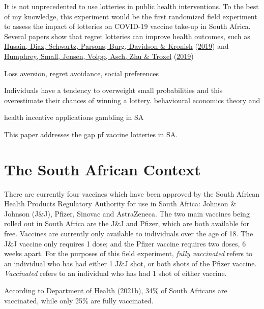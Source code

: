 \documentclass[11pt,preprint, authoryear]{elsarticle}
\numberwithin{equation}{section}
\numberwithin{figure}{section}
\numberwithin{table}{section}
\begin{document}
It is not unprecedented to use lotteries in public health interventions.
To the best of my knowledge, this experiment would be the first
randomized field experiment to assess the impact of lotteries on
COVID-19 vaccine take-up in South Africa. Several papers show that
regret lotteries can improve health outcomes, such as
\protect\hyperlink{ref-regr}{Husain, Diaz, Schwartz, Parsons, Burg,
Davidson \& Kronish} (\protect\hyperlink{ref-regr}{2019}) and
\protect\hyperlink{ref-adhere}{Humphrey, Small, Jensen, Volpp, Asch, Zhu
\& Troxel} (\protect\hyperlink{ref-adhere}{2019})

Loss aversion, regret avoidance, social preferences

Individuals have a tendency to overweight small probabilities and this
overestimate their chances of winning a lottery. behavioural economics
theory and

health incentive applications gambling in SA

This paper addresses the gap pf vaccine lotteries in SA.

\hypertarget{the-south-african-context}{%
\section{\texorpdfstring{The South African Context
\label{context}}{The South African Context }}\label{the-south-african-context}}

There are currently four vaccines which have been approved by the South
African Health Products Regulatory Authority for use in South Africa:
Johnson \& Johnson (J\&J), Pfizer, Sinovac and AstraZeneca. The two main
vaccines being rolled out in South Africa are the J\&J and Pfizer, which
are both available for free. Vaccines are currently only available to
individuals over the age of 18. The J\&J vaccine only requires 1 dose;
and the Pfizer vaccine requires two doses, 6 weeks apart. For the
purposes of this field experiment, \emph{fully vaccinated} refers to an
individual who has had either 1 J\&J shot, or both shots of the Pfizer
vaccine. \emph{Vaccinated} refers to an individual who has had 1 shot of
either vaccine.

According to \protect\hyperlink{ref-stat}{Department of Health}
(\protect\hyperlink{ref-stat}{2021b}), 34\% of South Africans are
vaccinated, while only 25\% are fully vaccinated.
\end{document}
